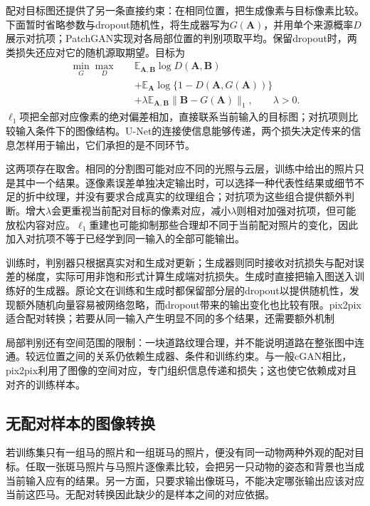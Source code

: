 配对目标图还提供了另一条直接约束：在相同位置，把生成像素与目标像素比较。下面暂时省略参数与dropout随机性，将生成器写为$G(\bm{A})$，并用单个来源概率$D$展示对抗项；PatchGAN实现对各局部位置的判别项取平均。保留dropout时，两类损失还应对它的随机源取期望。目标为
\begin{equation}
  \label{eq:neural-generative-pix2pix}
  \begin{aligned}
  \min_G\max_D\quad
    &\mathbb{E}_{\bm{A},\bm{B}}\log D(\bm{A},\bm{B})\\
    &+\mathbb{E}_{\bm{A}}\log\{1-D(\bm{A},G(\bm{A}))\}\\
    &+\lambda\mathbb{E}_{\bm{A},\bm{B}}
        \lVert\bm{B}-G(\bm{A})\rVert_1,
       \qquad\lambda>0.
  \end{aligned}
\end{equation}
$\ell_1$项把全部对应像素的绝对偏差相加，直接联系当前输入的目标图；对抗项则比较输入条件下的图像结构。U-Net的连接使信息能够传递，两个损失决定传来的信息怎样用于输出，它们承担的是不同环节。

这两项存在取舍。相同的分割图可能对应不同的光照与云层，训练中给出的照片只是其中一个结果。逐像素误差单独决定输出时，可以选择一种代表性结果或细节不足的折中纹理，并没有要求合成真实的纹理组合；对抗项为这些组合提供额外判断。增大$\lambda$会更重视当前配对目标的像素对应，减小$\lambda$则相对加强对抗项，但可能放松内容对应。$\ell_1$重建也可能抑制那些合理却不同于当前配对照片的变化，因此加入对抗项不等于已经学到同一输入的全部可能输出。

训练时，判别器只根据真实对和生成对更新；生成器则同时接收对抗损失与配对误差的梯度，实际可用非饱和形式计算生成端对抗损失。生成时直接把输入图送入训练好的生成器。原论文在训练和生成时都保留部分层的dropout以提供随机性，发现额外随机向量容易被网络忽略，而dropout带来的输出变化也比较有限。pix2pix适合配对转换；若要从同一输入产生明显不同的多个结果，还需要额外机制

局部判别还有空间范围的限制：一块道路纹理合理，并不能说明道路在整张图中连通。较远位置之间的关系仍依赖生成器、条件和训练约束。与一般cGAN相比，pix2pix利用了图像的空间对应，专门组织信息传递和损失；这也使它依赖成对且对齐的训练样本。

\subsection{无配对样本的图像转换}
\label{sec:neural-generative-cyclegan}

若训练集只有一组马的照片和一组斑马的照片，便没有同一动物两种外观的配对目标。任取一张斑马照片与马照片逐像素比较，会把另一只动物的姿态和背景也当成当前输入应有的结果。另一方面，只要求输出像斑马，不能决定哪张输出应该对应当前这匹马。无配对转换因此缺少的是样本之间的对应依据。

